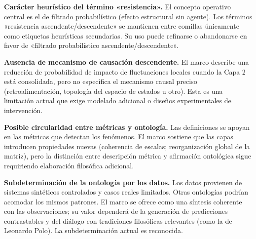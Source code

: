 \textbf{Carácter heurístico del término «resistencia».} El concepto operativo central es el de filtrado probabilístico (efecto estructural sin agente). Los términos «resistencia ascendente/descendente» se mantienen entre comillas únicamente como etiquetas heurísticas secundarias. Su uso puede refinarse o abandonarse en favor de «filtrado probabilístico ascendente/descendente».

\textbf{Ausencia de mecanismo de causación descendente.} El marco describe una reducción de probabilidad de impacto de fluctuaciones locales cuando la Capa 2 está consolidada, pero no especifica el mecanismo causal preciso (retroalimentación, topología del espacio de estados u otro). Esta es una limitación actual que exige modelado adicional o diseños experimentales de intervención.

\textbf{Posible circularidad entre métricas y ontología.} Las definiciones se apoyan en las métricas que detectan los fenómenos. El marco sostiene que las capas introducen propiedades nuevas (coherencia de escalas; reorganización global de la matriz), pero la distinción entre descripción métrica y afirmación ontológica sigue requiriendo elaboración filosófica adicional.

\textbf{Subdeterminación de la ontología por los datos.} Los datos provienen de sistemas sintéticos controlados y casos reales limitados. Otras ontologías podrían acomodar los mismos patrones. El marco se ofrece como una síntesis coherente con las observaciones; su valor dependerá de la generación de predicciones contrastables y del diálogo con tradiciones filosóficas relevantes (como la de Leonardo Polo). La subdeterminación actual es reconocida.